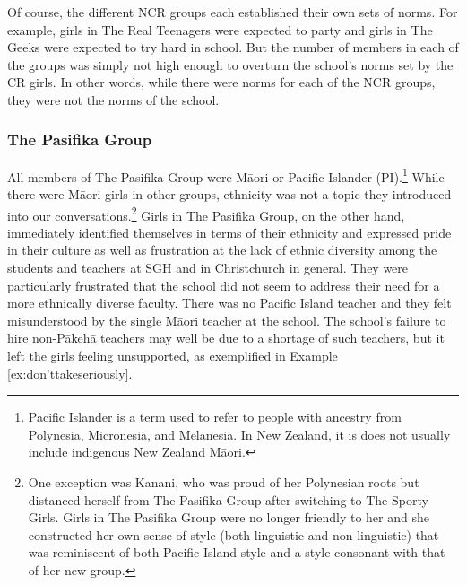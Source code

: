 Of course, the different NCR groups each established their own sets of norms. For example, girls in The Real Teenagers were expected to party and girls in The Geeks were expected to try hard in school. But the number of members in each of the groups was simply not high enough to overturn the school's norms set by the CR girls. In other words, while there were norms for each of the NCR groups, they were not the norms of the school.

\subsubsection{The Pasifika Group}

All members of The Pasifika Group were M\=aori or Pacific Islander (PI).\footnote{Pacific Islander is a term used to refer to people with ancestry from Polynesia, Micronesia, and Melanesia. In New Zealand, it is does not usually include indigenous New Zealand M\=aori.} While there were M\=aori girls in other groups, ethnicity was not a topic they introduced into our conversations.\footnote{One exception was Kanani, who was proud of her Polynesian roots but distanced herself from The Pasifika Group after switching to The Sporty Girls. Girls in The Pasifika Group were no longer friendly to her and she constructed her own sense of style (both linguistic and non-linguistic) that was reminiscent of both Pacific Island style and a style consonant with that of her new group.}  Girls in The Pasifika Group, on the other hand, immediately identified themselves in terms of their ethnicity and expressed pride in their culture as well as frustration at the lack of ethnic diversity among the students and teachers at SGH and in Christchurch in general. They were particularly frustrated that the school did not seem to address their need for a more ethnically diverse faculty. There was no Pacific Island teacher and they felt misunderstood by the single M\=aori teacher at the school.  The school's failure to hire non-P\=akeh\=a teachers may well be due to a shortage of such teachers, but it left the girls feeling unsupported, as exemplified in Example \ref{ex:don'ttakeseriously}.
  
			


\label{ex:don'ttakeseriously}

